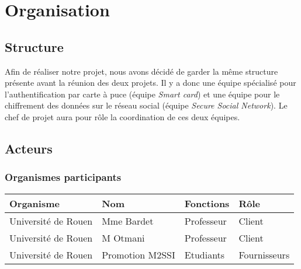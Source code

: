 \documentclass[a4paper,11pt,french]{article}
\begin{document}
\section{Organisation}
\subsection{Structure}
	Afin de réaliser notre projet, nous avons décidé de garder la même
structure présente avant la réunion des deux projets. Il y a donc une équipe
spécialisé pour l'authentification par carte à puce (équipe \emph{Smart 
card}) et une équipe pour le chiffrement des données sur le réseau social
(équipe \emph{Secure Social Network}). Le chef de projet aura pour rôle
la coordination de ces deux équipes.

\subsection{Acteurs}
\subsubsection{Organismes participants}
\begin{center}
	\begin{tabularx}{16cm}{|X|X|X|X|}
	\hline
	\bfseries{Organisme} & \bfseries{Nom} & \bfseries{Fonctions} & \bfseries{Rôle}\\
	\hline
	Université de Rouen & Mme Bardet & Professeur & Client\\
	\hline
	Université de Rouen & M Otmani & Professeur & Client\\
	\hline
	Université de Rouen & Promotion M2SSI & Etudiants & Fournisseurs\\
	\hline
	\end{tabularx}
\end{center}
\vspace*{0cm}
\end{document}
